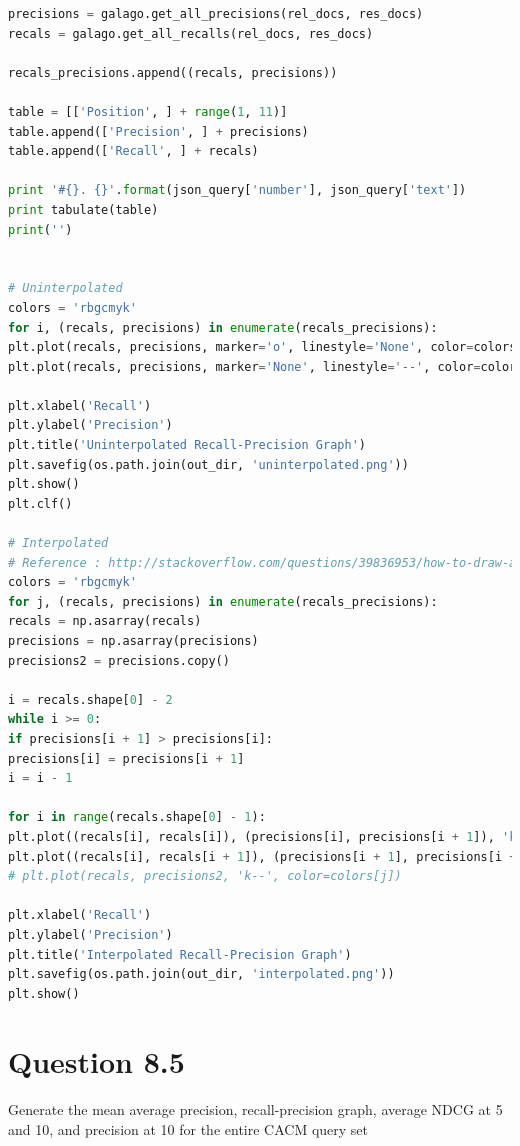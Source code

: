 \documentclass[letterpaper,11pt]{article}
\begin{document}
\begin{lstlisting}[language=python, caption={Code for question 8.4}, label={lst:84}]
precisions = galago.get_all_precisions(rel_docs, res_docs)
recals = galago.get_all_recalls(rel_docs, res_docs)

recals_precisions.append((recals, precisions))

table = [['Position', ] + range(1, 11)]
table.append(['Precision', ] + precisions)
table.append(['Recall', ] + recals)

print '#{}. {}'.format(json_query['number'], json_query['text'])
print tabulate(table)
print('')


# Uninterpolated
colors = 'rbgcmyk'
for i, (recals, precisions) in enumerate(recals_precisions):
plt.plot(recals, precisions, marker='o', linestyle='None', color=colors[i])
plt.plot(recals, precisions, marker='None', linestyle='--', color=colors[i])

plt.xlabel('Recall')
plt.ylabel('Precision')
plt.title('Uninterpolated Recall-Precision Graph')
plt.savefig(os.path.join(out_dir, 'uninterpolated.png'))
plt.show()
plt.clf()

# Interpolated
# Reference : http://stackoverflow.com/questions/39836953/how-to-draw-a-precision-recall-curve-with-interpolation-in-python
colors = 'rbgcmyk'
for j, (recals, precisions) in enumerate(recals_precisions):
recals = np.asarray(recals)
precisions = np.asarray(precisions)
precisions2 = precisions.copy()

i = recals.shape[0] - 2
while i >= 0:
if precisions[i + 1] > precisions[i]:
precisions[i] = precisions[i + 1]
i = i - 1

for i in range(recals.shape[0] - 1):
plt.plot((recals[i], recals[i]), (precisions[i], precisions[i + 1]), 'k-', label='', color=colors[j])  # vertical
plt.plot((recals[i], recals[i + 1]), (precisions[i + 1], precisions[i + 1]), 'k-', label='', color=colors[j])  # horizontal
# plt.plot(recals, precisions2, 'k--', color=colors[j])

plt.xlabel('Recall')
plt.ylabel('Precision')
plt.title('Interpolated Recall-Precision Graph')
plt.savefig(os.path.join(out_dir, 'interpolated.png'))
plt.show()


\end{lstlisting}


\noindent\makebox[\linewidth]{\rule{\textwidth}{0.4pt}}

\section*{Question 8.5}
\begin{spverbatim}
Generate the mean average precision, recall-precision graph, average NDCG
at 5 and 10, and precision at 10 for the entire CACM query set
\end{spverbatim}
\end{document}
